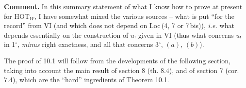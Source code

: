 \documentclass[11pt]{article}
\newcommand{\msp}[1]{\marginpar{\footnotesize [#1]}}
\newcommand{\HOT}{\mathrm{HOT}}
\begin{document}
\msp{page 137}

\textbf{Comment.} In this summary statement of what I know how to prove at present for $\HOT_W$, I have somewhat mixed the various sources – what is put ``for the record'' from VI (and which does not depend on Loc\,(4, 7 or 7\,bis)), \textit{i.e.} what depends essentially on the construction of $u_!$ given in VI (thus what concerns $u_!$ in 1$^{\circ}$, \textit{minus} right exactness, and all that concerns 3$^{\circ}$, $(a)$, $(b)$).

The proof of 10.1 will follow from the developments of the following section, taking into account the main result of section 8 (th. 8.4), and of section 7 (cor. 7.4), which are the ``hard'' ingredients of Theorem 10.1.
\end{document}
